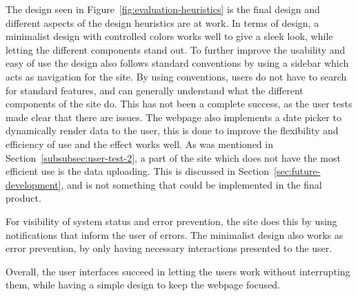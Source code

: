 The design seen in Figure~\ref{fig:evaluation-heuristics} is the final design
and different aspects of the design heuristics are at work.
In terms of design, a minimalist design with controlled colors works well
to give a sleek look, while letting the different components stand out.
To further improve the usability and easy of use the design also follows
standard conventions by using a sidebar which acts as navigation for the site.
By using conventions, users do not have to search for standard features, and
can generally understand what the different components of the site do.
This has not been a complete success, as the user tests made clear that there
are issues.
The webpage also implements a date picker to dynamically render data to the user,
this is done to improve the flexibility and efficiency of use and the effect
works well.
As was mentioned in Section~\ref{subsubsec:user-test-2}, a part of the site which
does not have the most efficient use is the data uploading.
This is discussed in Section~\ref{sec:future-development}, and is not something
that could be implemented in the final product.

For visibility of system status and error prevention, the site does this by using
notifications that inform the user of errors.
The minimalist design also works as error prevention, by only having necessary
interactions presented to the user.

Overall, the user interfaces succeed in letting the users work without interrupting
them, while having a simple design to keep the webpage focused.

